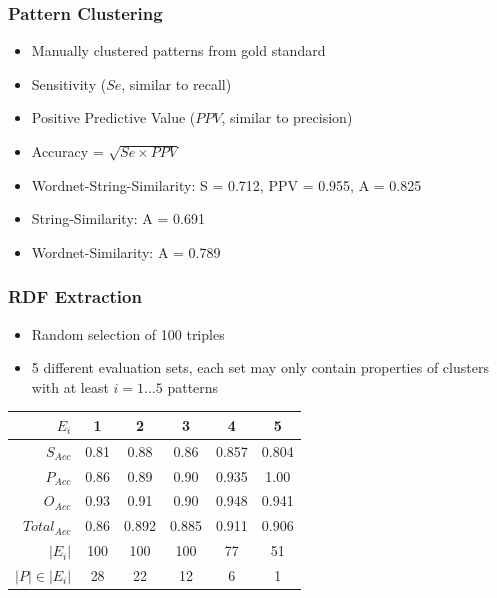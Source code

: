 \documentclass{beamer}
\begin{document}

\begin{frame}
    \frametitle{Pattern Clustering}
    \begin{itemize}
        \item Manually clustered patterns from gold standard 
        \item Sensitivity ($Se$, similar to recall)%
        \item Positive Predictive Value ($PPV$, similar to precision)%
        \item Accuracy = $\sqrt{Se \times PPV}$
\pause

        \item Wordnet-String-Similarity: S = 0.712, PPV = 0.955, A = 0.825 
        \item String-Similarity: A = 0.691
	\item Wordnet-Similarity: A = 0.789 
    \end{itemize}
\end{frame}


\begin{frame}
    \frametitle{RDF Extraction}
    \begin{itemize}
	\item Random selection of 100 triples
        \item 5 different evaluation sets, each set may only contain properties of clusters with at least $i = 1 \dots 5$ patterns
    \end{itemize}
    \begin{table}
    \begin{tabular}{rccccc} 
        \toprule
		$E_i$               &  1       &  2       &  3       &  4       &    5      \\ \midrule
		$S_{Acc}$           &  0.81  &  0.88  &  0.86  &  0.857  &  0.804 \\ 
		$P_{Acc}$           &  0.86  &  0.89  &  0.90  &  0.935  &  1.00 \\ 
        $O_{Acc}$           &  0.93  &  0.91  &  0.90  &  0.948  &  0.941 \\ 
		$Total_{Acc}$       &  0.86  &  0.892  &  0.885  &  0.911  &  0.906 \\ 
		$|E_i|$             &  100     &  100     &  100     &  77      &  51 \\ 
		$|P| \in |E_i|$     &  28      &  22      &  12      &  6       &  1 \\ \bottomrule
    \end{tabular}
    \end{table}
\end{frame}
\end{document}
